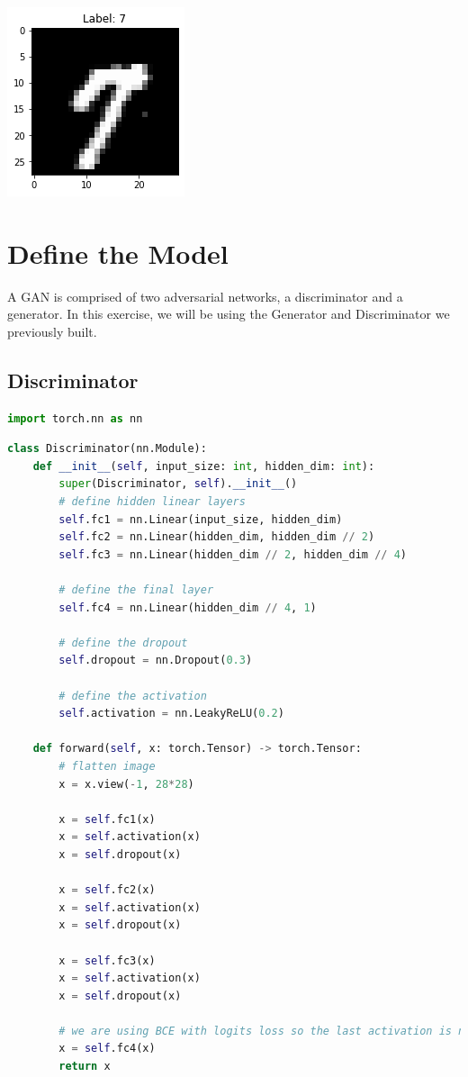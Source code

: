 \includegraphics{img/genAdvNet/gan/output_6_0.png}

\section{Define the Model}

A GAN is comprised of two adversarial networks, a discriminator and a
generator. In this exercise, we will be using the Generator and
Discriminator we previously built.

\subsection{Discriminator}

\begin{lstlisting}[language=Python]
import torch.nn as nn
\end{lstlisting}

\begin{lstlisting}[language=Python]
class Discriminator(nn.Module):
    def __init__(self, input_size: int, hidden_dim: int):
        super(Discriminator, self).__init__()
        # define hidden linear layers
        self.fc1 = nn.Linear(input_size, hidden_dim)
        self.fc2 = nn.Linear(hidden_dim, hidden_dim // 2)
        self.fc3 = nn.Linear(hidden_dim // 2, hidden_dim // 4)
        
        # define the final layer
        self.fc4 = nn.Linear(hidden_dim // 4, 1)        
        
        # define the dropout
        self.dropout = nn.Dropout(0.3)
        
        # define the activation
        self.activation = nn.LeakyReLU(0.2)
        
    def forward(self, x: torch.Tensor) -> torch.Tensor:
        # flatten image
        x = x.view(-1, 28*28)
        
        x = self.fc1(x)
        x = self.activation(x)
        x = self.dropout(x)

        x = self.fc2(x)
        x = self.activation(x)
        x = self.dropout(x)

        x = self.fc3(x)
        x = self.activation(x)
        x = self.dropout(x)
        
        # we are using BCE with logits loss so the last activation is not required
        x = self.fc4(x)
        return x
\end{lstlisting}

